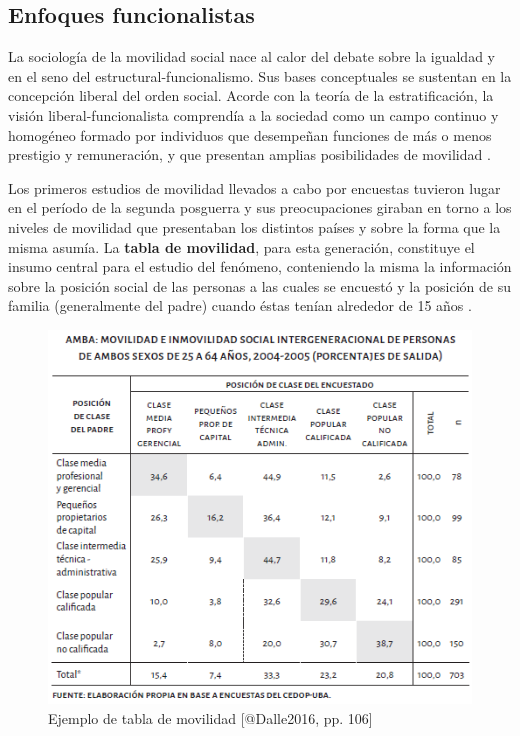\documentclass[
]{book}
\begin{document}
\hypertarget{enfoques-funcionalistas}{%
\subsection{Enfoques funcionalistas}\label{enfoques-funcionalistas}}

La sociología de la movilidad social nace al calor del debate sobre la igualdad y en el seno del estructural-funcionalismo. Sus bases conceptuales se sustentan en la concepción liberal del orden social. Acorde con la teoría de la estratificación, la visión liberal-funcionalista comprendía a la sociedad como un campo continuo y homogéneo formado por individuos que desempeñan funciones de más o menos prestigio y remuneración, y que presentan amplias posibilidades de movilidad \citep{Kerbo2003, CachonRodriguez1989}.

Los primeros estudios de movilidad llevados a cabo por encuestas tuvieron lugar en el período de la segunda posguerra y sus preocupaciones giraban en torno a los niveles de movilidad que presentaban los distintos países y sobre la forma que la misma asumía. La \textbf{tabla de movilidad}, para esta generación, constituye el insumo central para el estudio del fenómeno, conteniendo la misma la información sobre la posición social de las personas a las cuales se encuestó y la posición de su familia (generalmente del padre) cuando éstas tenían alrededor de 15 años \citep[pp.~3]{Breen2004}.

\begin{figure}

{\centering \includegraphics[width=0.8\linewidth]{imagenes/tabla_movilidad} 

}

\caption{Ejemplo de tabla de movilidad [@Dalle2016, pp. 106]}\label{fig:unnamed-chunk-91}
\end{figure}
\end{document}
